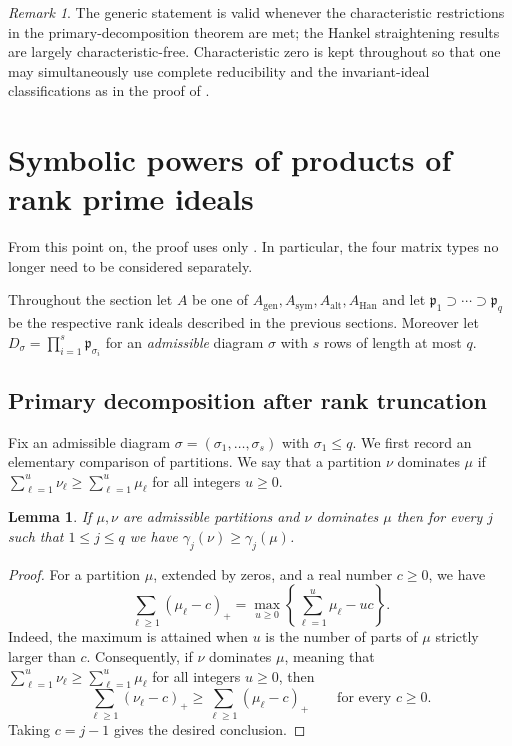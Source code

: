 \documentclass[11pt,reqno]{amsart}
\numberwithin{equation}{subsection}
\newtheorem{lemma}[theorem]{Lemma}
\theoremstyle{definition}
\theoremstyle{remark}
\newtheorem{remark}[theorem]{Remark}
\newcommand{\fp}{\mathfrak p}
\begin{document}
\begin{remark}\label{rem:characteristic}
The generic statement is valid whenever the characteristic restrictions
in the primary-decomposition theorem are met; the Hankel straightening results are largely characteristic-free.  Characteristic zero is kept
throughout so that one may simultaneously use complete reducibility and
the invariant-ideal classifications as in the proof of .
\end{remark}

\section{Symbolic powers of products of rank prime ideals}\label{sec:symbolic-prod}

From this point on, the proof uses only
.  In particular, the four matrix types no longer
need to be considered separately. 

Throughout the section let $A$ be one of
$A_{\mathrm{gen}},A_{\mathrm{sym}},A_{\mathrm{alt}},A_{\mathrm{Han}}$
and let $\fp_1\supset\cdots\supset\fp_q$ be the respective  rank ideals described in the previous sections.
Moreover let $D_\sigma=\prod_{i=1}^s\fp_{\sigma_i}$ for an {\em admissible} diagram $\sigma$  with $s$ rows of length at most $q$.

\subsection{Primary decomposition after rank truncation}\label{sec:primary}

Fix an admissible diagram
$\sigma=(\sigma_1,\ldots,\sigma_s)$ with $\sigma_1\le q$.  
We first record an elementary comparison of partitions. We say that a partition  $\nu$ dominates $\mu$ if $\sum_{\ell=1}^{u} \nu_\ell\geq \sum_{\ell=1}^{u} \mu_
\ell$ for all integers $u\geq 0$.

\begin{lemma}\label{lem: hinge}
If $\mu,\nu$ are admissible partitions and $\nu$ dominates $\mu$ then for every $j$ such that $1\leq j\leq q$ we have $\gamma_j(\nu)\geq \gamma_j(\mu)$.
\end{lemma}
\begin{proof}
For a partition $\mu$, extended by zeros, and a real number $c\ge0$, we have
\begin{equation}\label{eq:hinge-sum}
 \sum_{\ell\ge1}(\mu_\ell-c)_+
 =
 \max_{u\ge0}
 \left\{\sum_{\ell=1}^{u}\mu_\ell-uc\right\}.
\end{equation}
Indeed, the maximum is attained when $u$ is the number of
parts of $\mu$ strictly larger than $c$. Consequently, if
$\nu$ dominates $\mu$, meaning that $\sum_{\ell=1}^{u} \nu_\ell\geq \sum_{\ell=1}^{u} \mu_\ell$ for all integers $u\geq 0$, then
\begin{equation}\label{eq:hinge-dominance}
 \sum_{\ell\ge1}(\nu_\ell-c)_+
 \ge
 \sum_{\ell\ge1}(\mu_\ell-c)_+
 \qquad\text{for every }c\ge0.
\end{equation}
Taking $c=j-1$ gives the desired conclusion.
\end{proof}
\end{document}
